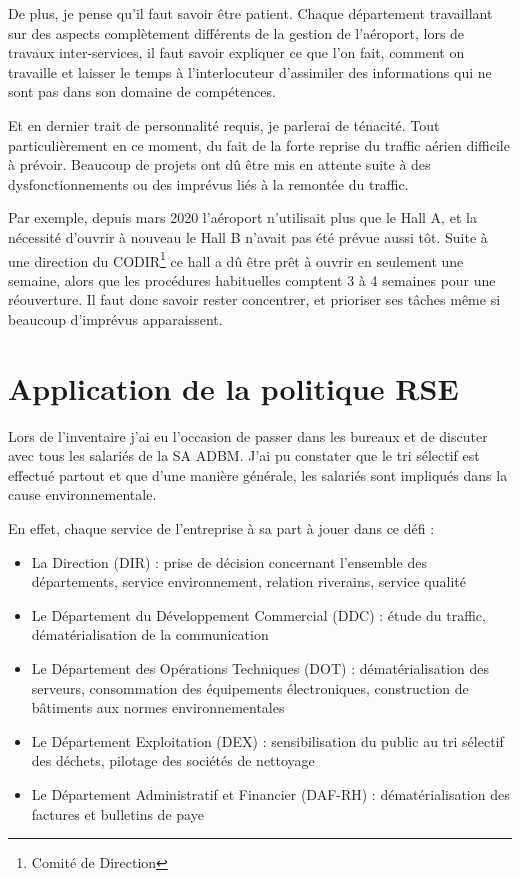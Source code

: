 De plus, je pense qu'il faut savoir être patient. Chaque département travaillant sur des aspects complètement différents de la gestion de l'aéroport, lors de travaux inter-services, il faut savoir expliquer ce que l'on fait, comment on travaille et laisser le temps à l'interlocuteur d'assimiler des informations qui ne sont pas dans son domaine de compétences.\newline

Et en dernier trait de personnalité requis, je parlerai de ténacité. Tout particulièrement en ce moment, du fait de la forte reprise du traffic aérien difficile à prévoir. Beaucoup de projets ont dû être mis en attente suite à des dysfonctionnements ou des imprévus liés à la remontée du traffic.

Par exemple, depuis mars 2020 l’aéroport n’utilisait plus que le Hall A, et la nécessité d’ouvrir à nouveau le Hall B n’avait pas été prévue aussi tôt. Suite à une direction du CODIR\footnote{Comité de Direction} ce hall a dû être prêt à ouvrir en seulement une semaine, alors que les procédures habituelles comptent 3 à 4 semaines pour une réouverture. Il faut donc savoir rester concentrer, et prioriser ses tâches même si beaucoup d'imprévus apparaissent.

\newpage

\section{Application de la politique RSE}

Lors de l'inventaire j'ai eu l'occasion de passer dans les bureaux et de discuter avec tous les salariés de la SA ADBM. J'ai pu constater que le tri sélectif est effectué partout et que d'une manière générale, les salariés sont impliqués dans la cause environnementale.\newline

En effet, chaque service de l'entreprise à sa part à jouer dans ce défi :

\begin{itemize}
    \item La Direction (DIR) : prise de décision concernant l'ensemble des départements, service environnement, relation riverains, service qualité
    \item Le Département du Développement Commercial (DDC) : étude du traffic, dématérialisation de la communication
    \item Le Département des Opérations Techniques (DOT) : dématérialisation des serveurs, consommation des équipements électroniques, construction de bâtiments aux normes environnementales
    \item Le Département Exploitation (DEX) : sensibilisation du public au tri sélectif des déchets, pilotage des sociétés de nettoyage
    \item Le Département Administratif et Financier (DAF-RH) : dématérialisation des factures et bulletins de paye\newline
\end{itemize}

